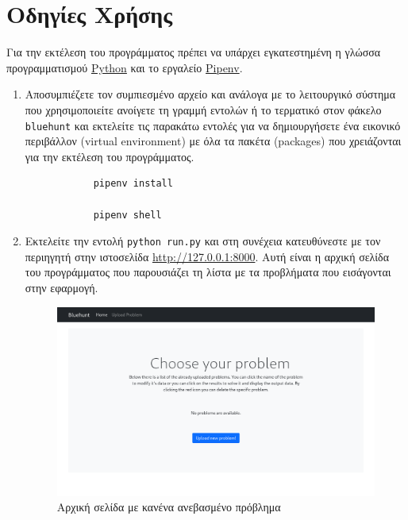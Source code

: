 \documentclass[11pt,a4paper,titlepage]{article}
\numberwithin{equation}{section}
\begin{document}
\section{Οδηγίες Χρήσης}
\label{sec:instructions}

Για την εκτέλεση του προγράμματος πρέπει να υπάρχει εγκατεστημένη η γλώσσα προγραμματισμού \href{https://www.python.org/downloads/}{Python} και το εργαλείο \href{https://pipenv.pypa.io/en/latest/install/}{Pipenv}.

\begin{enumerate}
	\item Αποσυμπιέζετε τον συμπιεσμένο αρχείο και ανάλογα με το λειτουργικό σύστημα που χρησιμοποιείτε ανοίγετε τη γραμμή εντολών ή το τερματικό στον φάκελο \texttt{bluehunt} και εκτελείτε τις παρακάτω εντολές για να δημιουργήσετε ένα εικονικό περιβάλλον (virtual environment) με όλα τα πακέτα (packages) που χρειάζονται για την εκτέλεση του προγράμματος.
	
	\begin{verbatim}
			pipenv install
			
			pipenv shell
	\end{verbatim}
	
	\item Εκτελείτε την εντολή \texttt{python run.py} και στη συνέχεια κατευθύνεστε με τον περιηγητή στην ιστοσελίδα \url{http://127.0.0.1:8000}. Αυτή είναι η αρχική σελίδα του προγράμματος που παρουσιάζει τη λίστα με τα προβλήματα που εισάγονται στην εφαρμογή.
	
	\begin{figure}[H]
		\centering
		\includegraphics[width=0.8\linewidth]{media/index_no_prob.png}
		\caption{Αρχική σελίδα με κανένα ανεβασμένο πρόβλημα}
		\label{fig:index_no_prob}
	\end{figure}
	

\end{enumerate}
\end{document}
